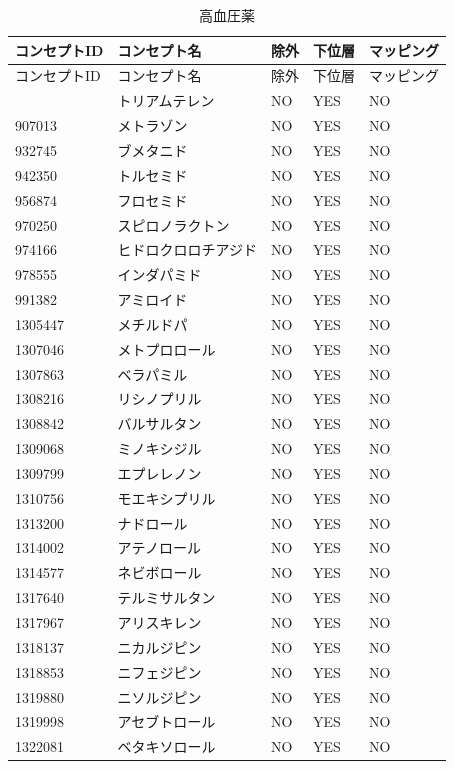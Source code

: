 \documentclass[
  11pt]{book}
\theoremstyle{definition}
\theoremstyle{definition}
\theoremstyle{definition}
\theoremstyle{definition}
\theoremstyle{remark}
\begin{document}
\begin{longtable}[]{@{}lllll@{}}
\caption{\label{tab:HTN1yrFODrugs} 高血圧薬}\tabularnewline
\toprule\noalign{}
コンセプトID & コンセプト名 & 除外 & 下位層 & マッピング \\
\midrule\noalign{}
\endfirsthead
\toprule\noalign{}
コンセプトID & コンセプト名 & 除外 & 下位層 & マッピング \\
\midrule\noalign{}
\endhead
\bottomrule\noalign{}
\endlastfoot
904542 & トリアムテレン & NO & YES & NO \\
907013 & メトラゾン & NO & YES & NO \\
932745 & ブメタニド & NO & YES & NO \\
942350 & トルセミド & NO & YES & NO \\
956874 & フロセミド & NO & YES & NO \\
970250 & スピロノラクトン & NO & YES & NO \\
974166 & ヒドロクロロチアジド & NO & YES & NO \\
978555 & インダパミド & NO & YES & NO \\
991382 & アミロイド & NO & YES & NO \\
1305447 & メチルドパ & NO & YES & NO \\
1307046 & メトプロロール & NO & YES & NO \\
1307863 & ベラパミル & NO & YES & NO \\
1308216 & リシノプリル & NO & YES & NO \\
1308842 & バルサルタン & NO & YES & NO \\
1309068 & ミノキシジル & NO & YES & NO \\
1309799 & エプレレノン & NO & YES & NO \\
1310756 & モエキシプリル & NO & YES & NO \\
1313200 & ナドロール & NO & YES & NO \\
1314002 & アテノロール & NO & YES & NO \\
1314577 & ネビボロール & NO & YES & NO \\
1317640 & テルミサルタン & NO & YES & NO \\
1317967 & アリスキレン & NO & YES & NO \\
1318137 & ニカルジピン & NO & YES & NO \\
1318853 & ニフェジピン & NO & YES & NO \\
1319880 & ニソルジピン & NO & YES & NO \\
1319998 & アセブトロール & NO & YES & NO \\
1322081 & ベタキソロール & NO & YES & NO \\

\end{longtable}
\end{document}
